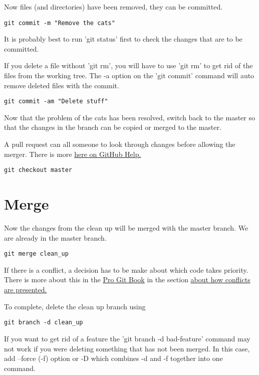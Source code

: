 \documentclass[11pt]{article} %
\begin{document}
Now files (and directories) have been removed, they can be committed. 

\begin{lstlisting}
git commit -m "Remove the cats"  
\end{lstlisting}
 It is probably best to run 'git status' first to check the changes that are to be committed.  

If you delete a file without 'git rm', you will have to use 'git rm' to get rid of the files from the working tree.  The -a option on the 'git commit' command will auto remove deleted files with the commit. 

\begin{lstlisting}
git commit -am "Delete stuff"  
\end{lstlisting}

Now that the problem of the cats has been resolved, switch back to the master so that the changes in the branch can be copied or merged to the master. 

A pull request can all someone to look through changes before allowing the merger.  There is more \href{https://help.github.com/articles/using-pull-requests}{here on GitHub Help.}

\begin{lstlisting}
git checkout master  
\end{lstlisting}

\section{Merge}
Now the changes from the clean up will be merged with the master branch.  We are already in the master branch.  

\begin{lstlisting}
git merge clean_up  
\end{lstlisting}

If there is a conflict, a decision has to be make about which code takes priority.  There is more about this in the \href{http://git-scm.com/book}{Pro Git Book} in the section \href{http://git-scm.com/docs/git-merge#_how_conflicts_are_presented}{about how conflicts are presented.}

To complete, delete the clean up branch using 

\begin{lstlisting}
git branch -d clean_up 
\end{lstlisting}

If you want to get rid of a feature the 'git branch -d bad-feature' command may not work if you were deleting something that has not been merged.  In this case, add --force (-f) option or -D which combines -d and -f together into one command. 
\end{document}
